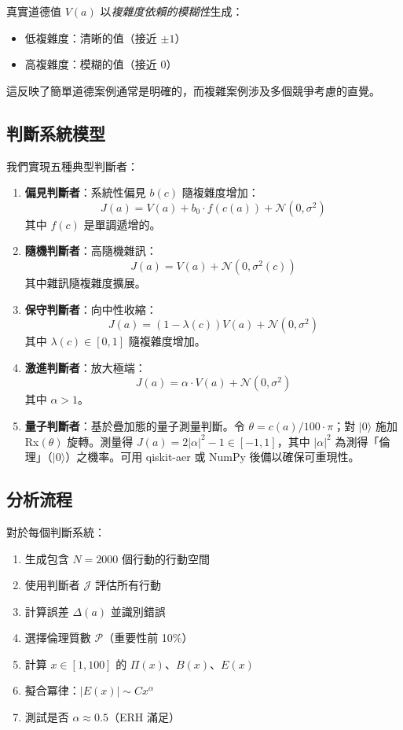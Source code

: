 \documentclass[12pt,a4paper]{article}
\theoremstyle{definition}
\theoremstyle{remark}
\begin{document}
真實道德值 $V(a)$ 以\emph{複雜度依賴的模糊性}生成：
\begin{itemize}
    \item 低複雜度：清晰的值（接近 $\pm 1$）
    \item 高複雜度：模糊的值（接近 $0$）
\end{itemize}

這反映了簡單道德案例通常是明確的，而複雜案例涉及多個競爭考慮的直覺。

\subsection{判斷系統模型}

我們實現五種典型判斷者：

\begin{enumerate}
    \item \textbf{偏見判斷者}：系統性偏見 $b(c)$ 隨複雜度增加：
    \[
    J(a) = V(a) + b_0 \cdot f(c(a)) + \mathcal{N}(0, \sigma^2)
    \]
    其中 $f(c)$ 是單調遞增的。
    
    \item \textbf{隨機判斷者}：高隨機雜訊：
    \[
    J(a) = V(a) + \mathcal{N}(0, \sigma^2(c))
    \]
    其中雜訊隨複雜度擴展。
    
    \item \textbf{保守判斷者}：向中性收縮：
    \[
    J(a) = (1-\lambda(c)) V(a) + \mathcal{N}(0, \sigma^2)
    \]
    其中 $\lambda(c) \in [0,1]$ 隨複雜度增加。
    
    \item \textbf{激進判斷者}：放大極端：
    \[
    J(a) = \alpha \cdot V(a) + \mathcal{N}(0, \sigma^2)
    \]
    其中 $\alpha > 1$。
    
    \item \textbf{量子判斷者}：基於疊加態的量子測量判斷。令 $\theta = c(a)/100 \cdot \pi$；對 $|0\rangle$ 施加 Rx$(\theta)$ 旋轉。測量得 $J(a) = 2|\alpha|^2 - 1 \in [-1, 1]$，其中 $|\alpha|^2$ 為測得「倫理」（$|0\rangle$）之機率。可用 qiskit-aer 或 NumPy 後備以確保可重現性。
\end{enumerate}

\subsection{分析流程}

對於每個判斷系統：
\begin{enumerate}
    \item 生成包含 $N = 2000$ 個行動的行動空間
    \item 使用判斷者 $\mathcal{J}$ 評估所有行動
    \item 計算誤差 $\Delta(a)$ 並識別錯誤
    \item 選擇倫理質數 $\mathcal{P}$（重要性前 10\%）
    \item 計算 $x \in [1, 100]$ 的 $\Pi(x)$、$B(x)$、$E(x)$
    \item 擬合冪律：$|E(x)| \sim C x^\alpha$
    \item 測試是否 $\alpha \approx 0.5$（ERH 滿足）
\end{enumerate}
\end{document}

